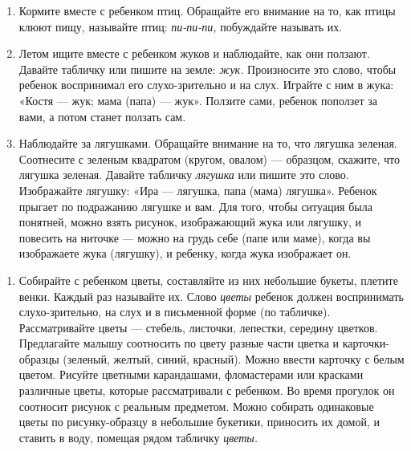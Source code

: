 \documentclass{book}
\renewcommand{\emph}[1]{\textit{#1}}
\begin{document}
\begin{enumerate}
\def\labelenumi{\arabic{enumi}.}
\item
  
  Кормите вместе с ребенком птиц. Обращайте его внимание на то, как
  птицы клюют пищу, называйте птиц: \emph{пи-пи-пи,} побуждайте называть
  их.
  
\item
  
  Летом ищите вместе с ребенком жуков и наблюдайте, как они ползают.
  Давайте табличку или пишите на земле: \emph{жук.} Произносите это
  слово, чтобы ребенок воспринимал его слухо-зрительно и на слух.
  Играйте с ним в жука: «Костя --- жук; мама (папа) --- жук». Ползите
  сами, ребенок поползет за вами, а потом станет ползать сам.
  
\item
  
  Наблюдайте за лягушками. Обращайте внимание на то, что лягушка
  зеленая. Соотнесите с зеленым квадратом (кругом, овалом) --- образцом,
  скажите, что лягушка зеленая. Давайте табличку \emph{лягушка} или
  пишите это слово. Изображайте лягушку: «Ира --- лягушка, папа (мама)
  лягушка». Ребенок прыгает по подражанию лягушке и вам. Для того, чтобы
  ситуация была понятней, можно взять рисунок, изображающий жука или
  лягушку, и повесить на ниточке --- можно на грудь себе (папе или
  маме), когда вы изображаете жука (лягушку), и ребенку, когда жука
  изображает он.
  
\end{enumerate}

\begin{enumerate}
\def\labelenumi{\arabic{enumi}.}
\item
  
  Собирайте с ребенком цветы, составляйте из них небольшие букеты,
  плетите венки. Каждый раз называйте их. Слово \emph{цветы} ребенок
  должен воспринимать слухо-зрительно, на слух и в письменной форме (по
  табличке). Рассматривайте цветы --- стебель, листочки, лепестки,
  середину цветков. Предлагайте малышу соотносить по цвету разные части
  цветка и карточки-образцы (зеленый, желтый, синий, красный). Можно
  ввести карточку с белым цветом. Рисуйте цветными карандашами,
  фломастерами или красками различные цветы, которые рассматривали с
  ребенком. Во время прогулок он соотносит рисунок с реальным предметом.
  Можно собирать одинаковые цветы по рисунку-образцу в небольшие
  букетики, приносить их домой, и ставить в воду, помещая рядом табличку
  \emph{цветы.}
  
\end{enumerate}
\end{document}
